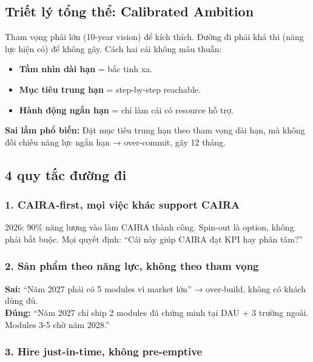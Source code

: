 \documentclass[11pt,a4paper]{article}
\begin{document}
\subsection{Triết lý tổng thể: Calibrated Ambition}

\begin{visionbox}[title=Calibrated Ambition]
Tham vọng phải lớn (10-year vision) để kích thích. Đường đi phải khả thi
(năng lực hiện có) để không gãy. Cách hai cái không mâu thuẫn:

\begin{itemize}
\item \textbf{Tầm nhìn dài hạn} = bắc tinh xa.
\item \textbf{Mục tiêu trung hạn} = step-by-step reachable.
\item \textbf{Hành động ngắn hạn} = chỉ làm cái có resource hỗ trợ.
\end{itemize}

\textbf{Sai lầm phổ biến:} Đặt mục tiêu trung hạn theo tham vọng dài hạn, mà
không đối chiếu năng lực ngắn hạn → over-commit, gãy 12 tháng.
\end{visionbox}

\subsection{4 quy tắc đường đi}

\subsubsection*{1. CAIRA-first, mọi việc khác support CAIRA}

2026: 90\% năng lượng vào làm CAIRA thành công. Spin-out là option, không phải
bắt buộc. Mọi quyết định: ``Cái này giúp CAIRA đạt KPI hay phân tâm?''

\subsubsection*{2. Sản phẩm theo năng lực, không theo tham vọng}

\textbf{Sai:} ``Năm 2027 phải có 5 modules vì market lớn'' → over-build, không có khách dùng đủ.\\
\textbf{Đúng:} ``Năm 2027 chỉ ship 2 modules đã chứng minh tại DAU + 3 trường ngoài. Modules 3-5 chờ năm 2028.''

\subsubsection*{3. Hire just-in-time, không pre-emptive}
\end{document}
